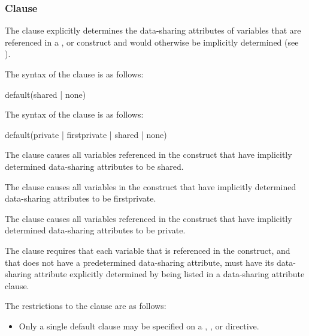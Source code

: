\subsubsection{ Clause}
\label{subsubsec:default clause}
\summary
The  clause explicitly determines the data-sharing attributes of variables that 
are referenced in a ,  or  construct and would otherwise be 
implicitly determined (see 
).

\syntax
\ccppspecificstart
The syntax of the  clause is as follows:

\begin{boxedcode}
default(shared \textnormal{|} none)
\end{boxedcode}
\ccppspecificend

\fortranspecificstart
The syntax of the  clause is as follows:

\begin{boxedcode}
default(private \textnormal{|} firstprivate \textnormal{|} shared \textnormal{|} none)
\end{boxedcode}
\fortranspecificend

\descr
The  clause causes all variables referenced in the construct that 
have implicitly determined data-sharing attributes to be shared.

\fortranspecificstart
The  clause causes all variables in the construct that have 
implicitly determined data-sharing attributes to be firstprivate.

The  clause causes all variables referenced in the construct that 
have implicitly determined data-sharing attributes to be private.
\fortranspecificend

The  clause requires that each variable that is referenced in the 
construct, and that does not have a predetermined data-sharing attribute, must have its 
data-sharing attribute explicitly determined by being listed in a data-sharing attribute 
clause. 

\restrictions
The restrictions to the  clause are as follows:

\begin{itemize}
\item Only a single default clause may be specified on a , , or  
directive. 
\end{itemize}









